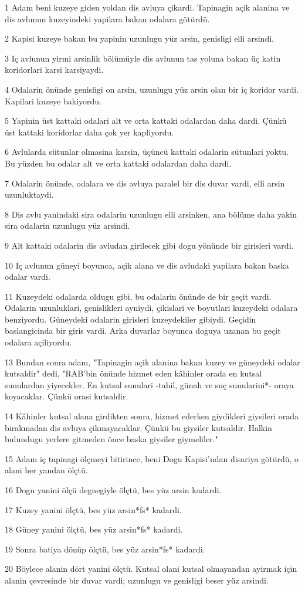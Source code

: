 \par 1 Adam beni kuzeye giden yoldan dis avluya çikardi. Tapinagin açik alanina ve dis avlunun kuzeyindeki yapilara bakan odalara götürdü.
\par 2 Kapisi kuzeye bakan bu yapinin uzunlugu yüz arsin, genisligi elli arsindi.
\par 3 Iç avlunun yirmi arsinlik bölümüyle dis avlunun tas yoluna bakan üç katin koridorlari karsi karsiyaydi.
\par 4 Odalarin önünde genisligi on arsin, uzunlugu yüz arsin olan bir iç koridor vardi. Kapilari kuzeye bakiyordu.
\par 5 Yapinin üst kattaki odalari alt ve orta kattaki odalardan daha dardi. Çünkü üst kattaki koridorlar daha çok yer kapliyordu.
\par 6 Avlularda sütunlar olmasina karsin, üçüncü kattaki odalarin sütunlari yoktu. Bu yüzden bu odalar alt ve orta kattaki odalardan daha dardi.
\par 7 Odalarin önünde, odalara ve dis avluya paralel bir dis duvar vardi, elli arsin uzunluktaydi.
\par 8 Dis avlu yanindaki sira odalarin uzunlugu elli arsinken, ana bölüme daha yakin sira odalarin uzunlugu yüz arsindi.
\par 9 Alt kattaki odalarin dis avludan girilecek gibi dogu yönünde bir girisleri vardi.
\par 10 Iç avlunun güneyi boyunca, açik alana ve dis avludaki yapilara bakan baska odalar vardi.
\par 11 Kuzeydeki odalarda oldugu gibi, bu odalarin önünde de bir geçit vardi. Odalarin uzunluklari, genislikleri ayniydi, çikislari ve boyutlari kuzeydeki odalara benziyordu. Güneydeki odalarin girisleri kuzeydekiler gibiydi. Geçidin baslangicinda bir giris vardi. Arka duvarlar boyunca doguya uzanan bu geçit odalara açiliyordu.
\par 13 Bundan sonra adam, "Tapinagin açik alanina bakan kuzey ve güneydeki odalar kutsaldir" dedi, "RAB'bin önünde hizmet eden kâhinler orada en kutsal sunulardan yiyecekler. En kutsal sunulari -tahil, günah ve suç sunularini*- oraya koyacaklar. Çünkü orasi kutsaldir.
\par 14 Kâhinler kutsal alana girdikten sonra, hizmet ederken giydikleri giysileri orada birakmadan dis avluya çikmayacaklar. Çünkü bu giysiler kutsaldir. Halkin bulundugu yerlere gitmeden önce baska giysiler giymeliler."
\par 15 Adam iç tapinagi ölçmeyi bitirince, beni Dogu Kapisi'ndan disariya götürdü, o alani her yandan ölçtü.
\par 16 Dogu yanini ölçü degnegiyle ölçtü, bes yüz arsin kadardi.
\par 17 Kuzey yanini ölçtü, bes yüz arsin*fs* kadardi.
\par 18 Güney yanini ölçtü, bes yüz arsin*fs* kadardi.
\par 19 Sonra batiya dönüp ölçtü, bes yüz arsin*fs* kadardi.
\par 20 Böylece alanin dört yanini ölçtü. Kutsal olani kutsal olmayandan ayirmak için alanin çevresinde bir duvar vardi; uzunlugu ve genisligi beser yüz arsindi.

